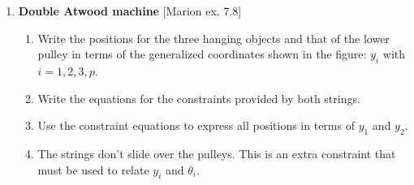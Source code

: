\documentclass[11pt, a4paper, twoside]{article}
\begin{document}
\begin{enumerate}
	\item
	\begin{minipage}[t][6.8cm]{0.67\textwidth}
		\textbf{Double Atwood machine} [Marion ex. 7.8]\\ 
		\begin{enumerate}
			\item Write the positions for the three hanging objects and that of the lower pulley in terms of the generalized coordinates shown in the figure: \(y_i\) with \(i = 1,2,3,p\). 
			\item Write the equations for the constraints provided by both strings.
			\item Use the constraint equations to express all positions in terms of \(y_1\) and \(y_2\).
			\item The strings don't slide over the pulleys. This is an extra constraint that must be used to relate \(y_i\) and \(\theta_i\).
		\end{enumerate}
	\end{minipage}
	\begin{minipage}[c][0cm][t]{0.3\textwidth}
		
	\end{minipage}


\end{enumerate}
\end{document}

